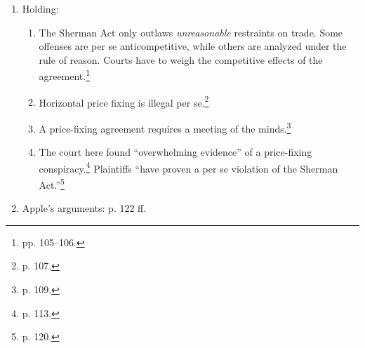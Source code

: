 \begin{enumerate}
\begin{enumerate}
        began at once.''\footnote{p. 83.}
        \item Jobs acknowledged to a reporter that the goal was to eliminate 
        competition from Amazon and raise ebook prices.\footnote{p. 86.}
        \item Soon, the ebooks saw ``sudden and uniform price increases'' across 
        the market.\footnote{p. 94.} ``The publisher defendants used the change 
        to an agency method for distributing their e-books as an opportunity to 
        raise the prices for their e-books across the board.''\footnote{p. 96.}
        \item The publishers lost sales as a result of the price increases, and 
        consumers suffered because they had to pay more for ebooks, buy cheaper 
        ebooks, or defer purchases entirely.\footnote{p. 98.}
    \end{enumerate}
    \item Holding:
    \begin{enumerate}
        \item The Sherman Act only outlaws \emph{unreasonable} restraints on 
        trade. Some offenses are per se anticompetitive, while others are 
        analyzed under the rule of reason. Courts have to weigh the competitive 
        effects of the agreement.\footnote{pp. 105--106.}
        \item Horizontal price fixing is illegal per se.\footnote{p. 107.}
        \item A price-fixing agreement requires a meeting of the 
        minds.\footnote{p. 109.}
        \item The court here found ``overwhelming evidence'' of a price-fixing 
        conspiracy.\footnote{p. 113.} Plaintiffs ``have proven a per se 
        violation of the Sherman Act.''\footnote{p. 120.}
    \end{enumerate}
    \item Apple's arguments: p. 122 ff.
\end{enumerate}
